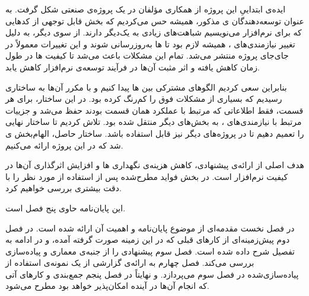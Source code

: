 ایده‌ی ابتداییِ این پروژه از همکاری مؤلفان در یک پروژه‌ی صنعتی شکل گرفت. به عنوان توسعه‌دهندگان ‌ی مذکور، همیشه حس می‌کردیم که بخش قابل توجهی از کدهایی که برای  نرم‌افزار می‌نویسیم شباهت‌های زیادی به یک‌دیگر دارند.
از سوی دیگر، به دلیل تغییر نیازمندی‌های ، همیشه لازم بود تا ‌ها به‌روزرسانی شوند و این تغییرات معمولاً در جای‌جای پروژه منتشر می‌شد. تمام این مشکلات باعث می‌شد تا کیفیت ‌ها در طول زمان کاهش یافته و اثر مثبت آن‌ها در فرآیند توسعه‌ی نرم‌افزار کاهش یابد.

بنابراین سعی کردیم الگوهای مشترکی بین ‌ها پیدا کنیم و با
 مکرر آن‌ها به ساختاری رسیدیم که بسیاری از مشکلات فوق
را کم‌رنگ کرده بود. در این ساختار، برای  هر قسمت، فقط
اطلاعاتی که مرتبط با عملکرد همان قسمت بودند حفظ می‌شد و جزییات مرتبط با
نیازمندی‌های ، به بخش‌های دیگر منتقل شده بود. تلاش کردیم تا
ساختار نهایی را تعمیم دهیم تا در پروژه‌های دیگر نیز قابل استفاده
باشد. ساختار حاصل، الهام‌بخش  ی شد که در این
پروژه ارائه می‌کنیم.

هدف اصلی از ارائه‌ی   پیشنهادی، کاهش هزینه‌ی نگهداری ها و افزایش اثرگذاری آن‌ها در کیفیت نرم‌افزار است. در بخش  فواید مطرح‌شده پس از استفاده از  مورد نظر را با دقت بیشتری بررسی خواهیم کرد.


این پایان‌نامه حاوی پنج فصل است.

در فصل نخست مقدمه‌ای از موضوع پایان‌نامه و اهمیت آن ارائه شده است. در فصل دوم پیش‌زمینه‌ای از کارهای قبلی که در این زمینه صورت گرفته آمده، و در ادامه  به تفصیل شرح داده شده است. فصل سوم   پیشنهادی را از جنبه‌ی معماری و پیاده‌سازی بررسی می‌کند. فصل چهارم به ارائه‌ی گزارشی از یک نمونه‌ی استفاده از  پیاده‌سازی‌شده در فصل سوم می‌پردازد. و نهایتاً در فصل پنجم جمع‌بندی و کارهای آتی که انجام آن‌ها در آینده امکان‌پذیر خواهد بود مطرح می‌شود.


